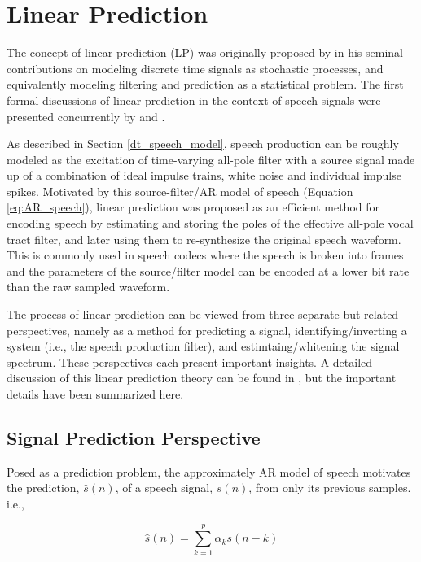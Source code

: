 \section{Linear Prediction} \label{linear_prediction}

The concept of linear prediction (LP) was originally proposed by \cite{wiener1949extrapolation} in his seminal contributions on modeling discrete time signals as stochastic processes, and equivalently modeling filtering and prediction as a statistical problem. The first formal discussions of linear prediction in the context of speech signals were presented concurrently by \cite{saito1967theoretical} and \cite{atal1970adaptive}.

As described in Section \ref{dt_speech_model}, speech production can be roughly modeled as the excitation of time-varying all-pole filter with a source signal made up of a combination of ideal impulse trains, white noise and individual impulse spikes. Motivated by this source-filter/AR model of speech (Equation \ref{eq:AR_speech}), linear prediction was proposed as an efficient method for encoding speech by estimating and storing the poles of the effective all-pole vocal tract filter, and later using them to re-synthesize the original speech waveform. This is commonly used in speech codecs where the speech is broken into frames and the parameters of the source/filter model can be encoded at a lower bit rate than the raw sampled waveform.

The process of linear prediction can be viewed from three separate but related perspectives, namely as a method for predicting a signal, identifying/inverting a system (i.e., the speech production filter), and estimtaing/whitening the signal spectrum. These perspectives each present important insights. A detailed discussion of this linear prediction theory can be found in \cite{quatieri2002discrete}, but the important details have been summarized here.

\subsection{Signal Prediction Perspective} \label{lp_signal_perspective}

Posed as a prediction problem, the approximately AR model of speech motivates the prediction, $\hat{s}(n)$, of a speech signal, $s(n)$, from only its previous samples. i.e.,

\begin{equation}
	\hat{s}(n) = \sum_{k=1}^{p}\alpha_k s(n-k) \label{eq:lpc_prediction}
\end{equation}

